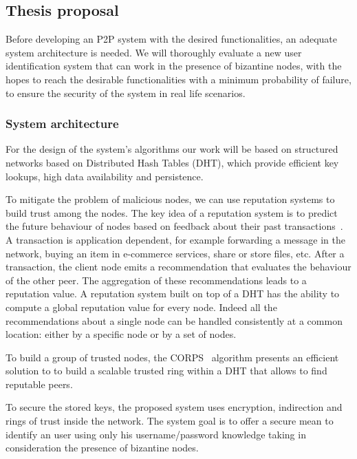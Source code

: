 \documentclass[12pt,spanish]{article}
\begin{document}
\subsection{Thesis proposal}

Before developing an P2P system with the desired functionalities, an adequate
system architecture is needed. We will thoroughly evaluate a new user
identification system that can work in the presence of bizantine nodes, with
the hopes to reach the desirable functionalities with a minimum probability of
failure, to ensure the security of the system in real life scenarios.

\subsubsection{System architecture}

For the design of the system's algorithms our work will be based on structured
networks based on Distributed Hash Tables (DHT), which provide efficient key
lookups, high data availability and persistence.

To mitigate the problem of malicious nodes, we can use reputation systems to
build trust among the nodes. The key
idea of a reputation system is to predict the future behaviour
of nodes based on feedback about their past
transactions~\cite{Resnick:2000:RS:355112.355122}. A
transaction is application dependent, for example forwarding a
message in the network, buying an item in e-commerce services,
share or store files, etc. After a transaction, the client node emits
a recommendation that evaluates the behaviour of the other peer.
The aggregation of these recommendations leads to a reputation
value.
A reputation system built on top of a DHT has the ability
to compute a global reputation value for every node. Indeed
all the recommendations about a single node can be handled
consistently at a common location: either by a specific node
or by a set of nodes.

To build a group of trusted nodes, the CORPS~\cite{rosas2011corps} algorithm
presents an efficient solution to to build a scalable
trusted ring within a DHT that allows to find reputable
peers.


To secure the stored keys, the proposed system uses encryption, indirection and
rings of trust inside the network. The system goal is to offer a secure mean to
identify an user using only his username/password knowledge taking in
consideration the presence of bizantine nodes.
\end{document}
